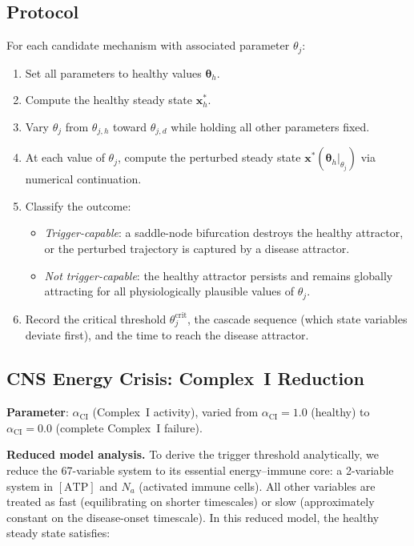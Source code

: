 \subsection{Protocol}
\label{sec:trigger-protocol}

For each candidate mechanism with associated parameter $\theta_j$:

\begin{enumerate}
    \item Set all parameters to healthy values $\boldsymbol{\theta}_h$.
    \item Compute the healthy steady state $\mathbf{x}_h^*$.
    \item Vary $\theta_j$ from $\theta_{j,h}$ toward $\theta_{j,d}$ while holding all other parameters fixed.
    \item At each value of $\theta_j$, compute the perturbed steady state $\mathbf{x}^*(\boldsymbol{\theta}_h|_{\theta_j})$ via numerical continuation.
    \item Classify the outcome:
    \begin{itemize}
        \item \emph{Trigger-capable}: a saddle-node bifurcation destroys the healthy attractor, or the perturbed trajectory is captured by a disease attractor.
        \item \emph{Not trigger-capable}: the healthy attractor persists and remains globally attracting for all physiologically plausible values of $\theta_j$.
    \end{itemize}
    \item Record the critical threshold $\theta_j^{\mathrm{crit}}$, the cascade sequence (which state variables deviate first), and the time to reach the disease attractor.
\end{enumerate}

\subsection{CNS Energy Crisis: Complex~I Reduction}
\label{sec:trigger-ci}

\textbf{Parameter}: $\alpha_{\text{CI}}$ (Complex~I activity), varied from $\alpha_{\text{CI}} = 1.0$ (healthy) to $\alpha_{\text{CI}} = 0.0$ (complete Complex~I failure).

\textbf{Reduced model analysis.} To derive the trigger threshold analytically, we reduce the 67-variable system to its essential energy--immune core: a 2-variable system in $[\text{ATP}]$ and $N_a$ (activated immune cells). All other variables are treated as fast (equilibrating on shorter timescales) or slow (approximately constant on the disease-onset timescale). In this reduced model, the healthy steady state satisfies:

